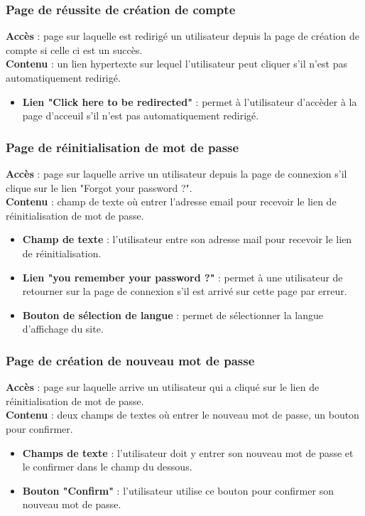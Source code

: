 \documentclass[../rapport.tex]{subfiles}
\begin{document}
\subsubsection{Page de réussite de création de compte}
\noindent \textbf{Accès} : page sur laquelle est redirigé un utilisateur depuis la page de création de compte si celle ci est un succès. \\ 
\textbf{Contenu} : un lien hypertexte sur lequel l'utilisateur peut cliquer s'il n'est pas automatiquement redirigé. 
\begin{itemize}
    \item \textbf{Lien "Click here to be redirected"} : permet à l'utilisateur d'accèder à la page d'acceuil s'il n'est pas automatiquement redirigé. 
\end{itemize}

\subsubsection{Page de réinitialisation de mot de passe} 
\noindent \textbf{Accès} : page sur laquelle arrive un utilisateur depuis la page de connexion s'il clique sur le lien "Forgot your password ?". \\
\textbf{Contenu} : champ de texte où entrer l'adresse email pour recevoir le lien de réinitialisation de mot de passe.
\begin{itemize}
    \item \textbf{Champ de texte} : l'utilisateur entre son adresse mail pour recevoir le lien de réinitialisation.
    \item \textbf{Lien "you remember your password ?"} : permet à une utilisateur de retourner sur la page de connexion s'il est arrivé sur cette page par erreur. 
    \item \textbf{Bouton de sélection de langue} : permet de sélectionner la langue d'affichage du site.
\end{itemize}

\subsubsection{Page de création de nouveau mot de passe}
\noindent \textbf{Accès} : page sur laquelle arrive un utilisateur qui a cliqué sur le lien de réinitialisation de mot de passe. \\
\textbf{Contenu} : deux champs de textes où entrer le nouveau mot de passe, un bouton pour confirmer.
\begin{itemize}
    \item \textbf{Champs de texte} : l'utilisateur doit y entrer son nouveau mot de passe et le confirmer dans le champ du dessous.
    \item \textbf{Bouton "Confirm"} : l'utilisateur utilise ce bouton pour confirmer son nouveau mot de passe.
\end{itemize}
\end{document}
